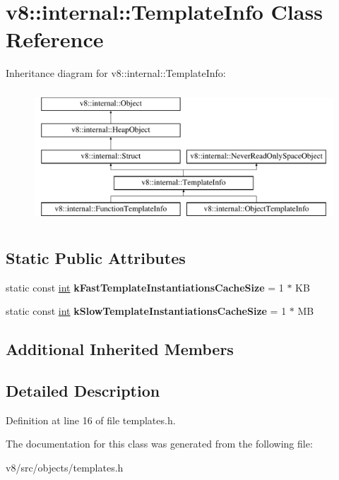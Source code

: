 \hypertarget{classv8_1_1internal_1_1TemplateInfo}{}\section{v8\+:\+:internal\+:\+:Template\+Info Class Reference}
\label{classv8_1_1internal_1_1TemplateInfo}
Inheritance diagram for v8\+:\+:internal\+:\+:Template\+Info\+:\begin{figure}[H]
\begin{center}
\leavevmode
\includegraphics[height=5.000000cm]{classv8_1_1internal_1_1TemplateInfo}
\end{center}
\end{figure}
\subsection*{Static Public Attributes}
\begin{DoxyCompactItemize}
\item 
\mbox{\label{classv8_1_1internal_1_1TemplateInfo_aa74ce0d5b2d89bcbdfb854f3fe69a4d9}} 
static const \mbox{\hyperlink{classint}{int}} {\bfseries k\+Fast\+Template\+Instantiations\+Cache\+Size} = 1 $\ast$ KB
\item 
\mbox{\label{classv8_1_1internal_1_1TemplateInfo_ad715151c3f4189090f4c69b3b0dd97d1}} 
static const \mbox{\hyperlink{classint}{int}} {\bfseries k\+Slow\+Template\+Instantiations\+Cache\+Size} = 1 $\ast$ MB
\end{DoxyCompactItemize}
\subsection*{Additional Inherited Members}


\subsection{Detailed Description}


Definition at line 16 of file templates.\+h.



The documentation for this class was generated from the following file\+:\begin{DoxyCompactItemize}
\item 
v8/src/objects/templates.\+h\end{DoxyCompactItemize}
